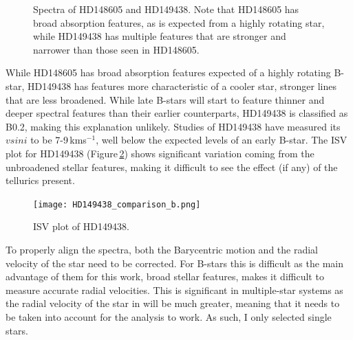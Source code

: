 \begin{figure}
	\hspace{-3cm}
	\captionsetup{width=.8\textwidth}
    \caption{Spectra of HD148605 and HD149438. Note that HD148605 has broad absorption features, as is expected from a highly rotating star, while HD149438 has multiple features that are stronger and narrower than those seen in HD148605.}
    \label{figBstar_spectra}
\end{figure}

While HD148605 has broad absorption features expected of a highly rotating B-star, HD149438 has features more characteristic of a cooler star, stronger lines that are less broadened. While late B-stars will start to feature thinner and deeper spectral features than their earlier counterparts, HD149438 is classified as B0.2, making this explanation unlikely. Studies of HD149438 have measured its $vsini$ to be 7-9\,kms$^{-1}$, well below the expected levels of an early B-star. The ISV plot for HD149438 (Figure\,\ref{figHD149438_ISV}) shows significant variation coming from the unbroadened stellar features, making it difficult to see the effect (if any) of the tellurics present.\\

\begin{figure}
	\centering
	\captionsetup{width=.8\textwidth}
    \texttt{[image: HD149438\_comparison\_b.png]}
    \caption{ISV plot of HD149438.}
    \label{figHD149438_ISV}
\end{figure}

To properly align the spectra, both the Barycentric motion and the radial velocity of the star need to be corrected. For B-stars this is difficult as the main advantage of them for this work, broad stellar features, makes it difficult to measure accurate radial velocities. This is significant in multiple-star systems as the radial velocity of the star in will be much greater, meaning that it needs to be taken into account for the analysis to work. As such, I only selected single stars.\\

